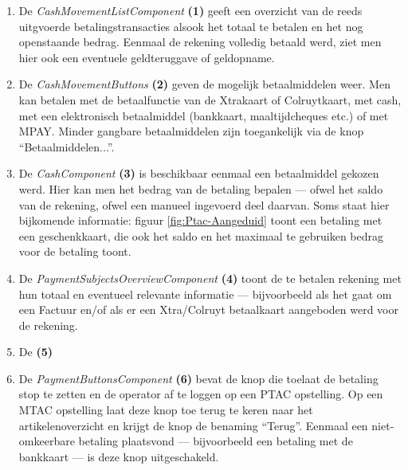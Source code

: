 \begin{enumerate}
    \item De \emph{CashMovementListComponent} \textbf{(1)} geeft een overzicht van de reeds uitgvoerde betalingstransacties alsook het totaal te betalen en het nog openstaande bedrag. Eenmaal de rekening volledig betaald werd, ziet men hier ook een eventuele geldteruggave of geldopname.
    \item De \emph{CashMovementButtons} \textbf{(2)} geven de mogelijk betaalmiddelen weer. Men kan betalen met de betaalfunctie van de Xtrakaart of Colruytkaart, met cash, met een elektronisch betaalmiddel (bankkaart, maaltijdcheques etc.) of met MPAY. Minder gangbare betaalmiddelen zijn toegankelijk via de knop ``Betaalmiddelen...''.
    \item De \emph{CashComponent} \textbf{(3)} is beschikbaar eenmaal een betaalmiddel gekozen werd. Hier kan men het bedrag van de betaling bepalen — ofwel het saldo van de rekening, ofwel een manueel ingevoerd deel daarvan. Soms staat hier bijkomende informatie: figuur \ref{fig:Ptac-Aangeduid} toont een betaling met een geschenkkaart, die ook het saldo en het maximaal te gebruiken bedrag voor de betaling toont.
    \item De \emph{PaymentSubjectsOverviewComponent} \textbf{(4)} toont de te betalen rekening met hun totaal en eventueel relevante informatie — bijvoorbeeld als het gaat om een Factuur en/of als er een Xtra/Colruyt betaalkaart aangeboden werd voor de rekening.
    \item De \emph{} \textbf{(5)}
    \item De \emph{PaymentButtonsComponent} \textbf{(6)} bevat de knop die toelaat de betaling stop te zetten en de operator af te loggen op een PTAC opstelling. Op een MTAC opstelling laat deze knop toe terug te keren naar het artikelenoverzicht en krijgt de knop de benaming ``Terug''. Eenmaal een niet-omkeerbare betaling plaatsvond — bijvoorbeeld een betaling met de bankkaart — is deze knop uitgeschakeld.
\end{enumerate}